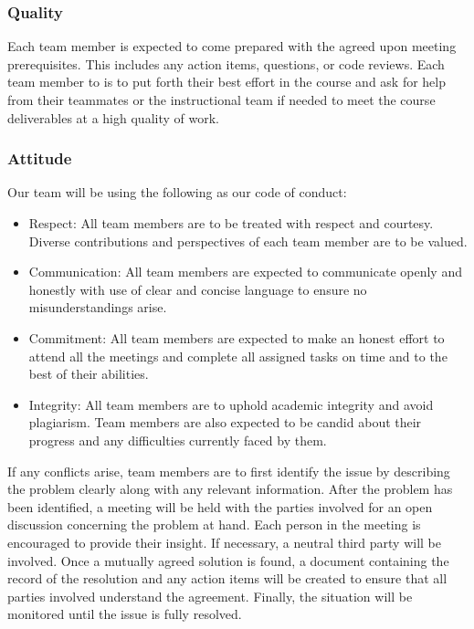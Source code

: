 \documentclass{article}
\begin{document}
\subsubsection*{Quality}

Each team member is expected to come prepared with the agreed upon
meeting prerequisites. This includes
any action items, questions, or code reviews. Each team member to is
to put forth their best effort in the
course and ask for help from their teammates or the instructional
team if needed to meet the course
deliverables at a high quality of work.

\subsubsection*{Attitude}

Our team will be using the following as our code of conduct:
\begin{itemize}
  \item Respect: All team members are to be treated with respect and
    courtesy. Diverse contributions and
    perspectives of each team member are to be valued.
  \item Communication: All team members are expected to communicate
    openly and honestly with use of
    clear and concise language to ensure no misunderstandings arise.
  \item Commitment: All team members are expected to make an honest
    effort to attend all the meetings and
    complete all assigned tasks on time and to the best of their abilities.
  \item Integrity: All team members are to uphold academic integrity
    and avoid plagiarism. Team members are
    also expected to be candid about their progress and any
    difficulties currently faced by them.
\end{itemize}
If any conflicts arise, team members are to first identify the issue
by describing the problem clearly along with
any relevant information. After the problem has been identified, a
meeting will be held with the parties
involved for an open discussion concerning the problem at hand. Each
person in the meeting is encouraged
to provide their insight. If necessary, a neutral third party will be
involved. Once a mutually agreed solution is
found, a document containing the record of the resolution and any
action items will be created to ensure that
all parties involved understand the agreement. Finally, the situation
will be monitored until the issue is fully
resolved.
\end{document}
